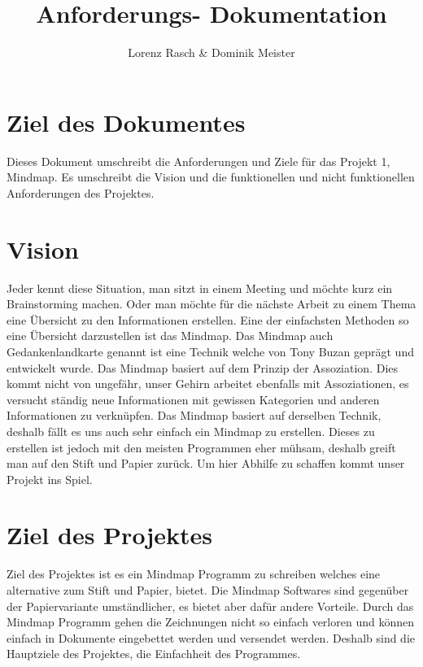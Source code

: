 \documentclass[a4paper,parskip]{scrartcl}
\title{Anforderungs- Dokumentation}
\author{Lorenz Rasch \& Dominik Meister}
\begin{document}
\maketitle
\tableofcontents
\pagebreak

\section{Ziel des Dokumentes}
Dieses Dokument umschreibt die Anforderungen und Ziele für das Projekt 1, Mindmap. Es umschreibt
die Vision und die funktionellen und nicht funktionellen Anforderungen des Projektes.

\section{Vision}
Jeder kennt diese Situation, man sitzt in einem Meeting und möchte kurz ein Brainstorming machen. Oder man
möchte für die nächste Arbeit zu einem Thema eine Übersicht zu den Informationen erstellen.
Eine der einfachsten Methoden so eine Übersicht darzustellen ist das Mindmap. Das Mindmap auch Gedankenlandkarte genannt ist eine Technik welche von Tony Buzan geprägt und entwickelt wurde.
Das Mindmap basiert auf dem Prinzip der Assoziation. Dies kommt nicht von ungefähr, unser Gehirn arbeitet ebenfalls mit Assoziationen, es versucht ständig neue Informationen mit gewissen Kategorien und anderen Informationen zu verknüpfen. Das Mindmap basiert auf derselben Technik, deshalb fällt es uns auch sehr einfach ein Mindmap zu erstellen.
Dieses zu erstellen ist jedoch mit den meisten Programmen eher mühsam, deshalb greift man auf den Stift und Papier zurück. Um hier Abhilfe zu schaffen kommt unser Projekt ins Spiel.
\newpage
\section{Ziel des Projektes}
Ziel des Projektes ist es ein Mindmap Programm zu schreiben welches eine alternative zum Stift und Papier,
bietet. Die Mindmap Softwares sind gegenüber der Papiervariante umständlicher, es bietet aber dafür andere
Vorteile. Durch das Mindmap Programm gehen die Zeichnungen nicht so einfach verloren und können einfach 
in Dokumente eingebettet werden und versendet werden. Deshalb sind die Hauptziele des Projektes, 
die Einfachheit des Programmes.  
\end{document}
